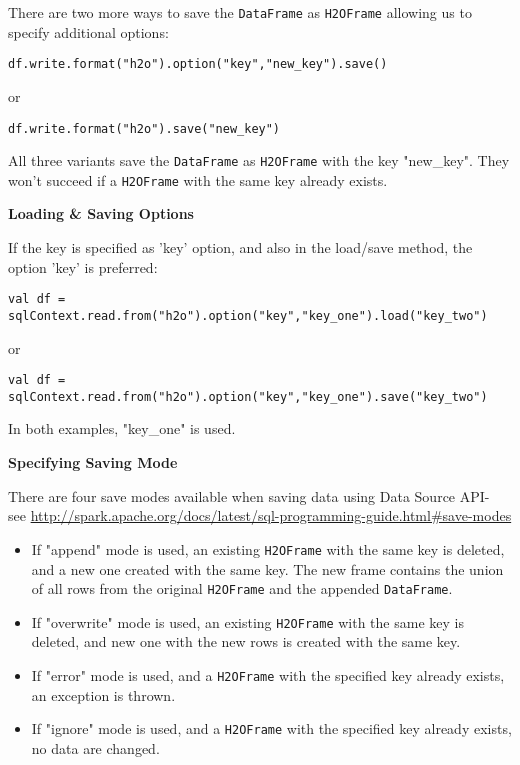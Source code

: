 There are two more ways to save the \texttt{DataFrame} as \texttt{H2OFrame} allowing us to specify additional options:
\begin{lstlisting}[style=Scala]
df.write.format("h2o").option("key","new_key").save()
\end{lstlisting}
or
\begin{lstlisting}[style=Scala]
df.write.format("h2o").save("new_key")
\end{lstlisting}

All three variants save the \texttt{DataFrame} as \texttt{H2OFrame} with the key "new\_key". They won't succeed if a \texttt{H2OFrame} with the same key already exists.

\textbf{Loading \& Saving Options}

If the key is specified as 'key' option, and also in the load/save method, the option 'key' is preferred:
\begin{lstlisting}[style=Scala]
val df = sqlContext.read.from("h2o").option("key","key_one").load("key_two")
\end{lstlisting}
or
\begin{lstlisting}[style=Scala]
val df = sqlContext.read.from("h2o").option("key","key_one").save("key_two")
\end{lstlisting}

In both examples, "key\_one" is used.

\textbf{Specifying Saving Mode}

There are four save modes available when saving data using Data Source API- see \url{http://spark.apache.org/docs/latest/sql-programming-guide.html#save-modes}

\begin{itemize}
\item If "append" mode is used, an existing \texttt{H2OFrame} with the same key is deleted, and a new one created with the same key. The new frame contains the union of all rows from the original \texttt{H2OFrame} and the appended \texttt{DataFrame}.
\item If "overwrite" mode is used, an existing \texttt{H2OFrame} with the same key is deleted, and new one with the new rows is created with the same key.
\item If "error" mode is used, and a \texttt{H2OFrame} with the specified key already exists, an exception is thrown.
\item If "ignore" mode is used, and a \texttt{H2OFrame} with the specified key already exists, no data are changed.
\end{itemize}


